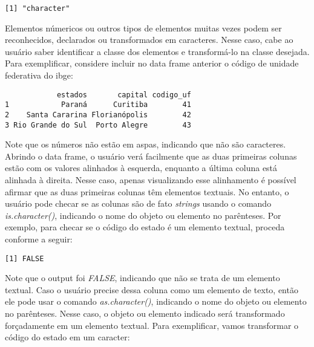\documentclass[
  letterpaper,
  DIV=11,
  numbers=noendperiod]{scrreprt}
\newenvironment{Shaded}{\begin{snugshade}}{\end{snugshade}}
\newcommand{\DecValTok}[1]{\textcolor[rgb]{0.68,0.00,0.00}{#1}}
\newcommand{\FunctionTok}[1]{\textcolor[rgb]{0.28,0.35,0.67}{#1}}
\newcommand{\NormalTok}[1]{\textcolor[rgb]{0.00,0.23,0.31}{#1}}
\newcommand{\OtherTok}[1]{\textcolor[rgb]{0.00,0.23,0.31}{#1}}
\newcommand{\SpecialCharTok}[1]{\textcolor[rgb]{0.37,0.37,0.37}{#1}}
\begin{document}
\begin{verbatim}
[1] "character"
\end{verbatim}

Elementos númericos ou outros tipos de elementos muitas vezes podem ser
reconhecidos, declarados ou transformados em caracteres. Nesse caso,
cabe ao usuário saber identificar a classe dos elementos e transformá-lo
na classe desejada. Para exemplificar, considere incluir no data frame
anterior o código de unidade federativa do ibge:

\begin{Shaded}
\end{Shaded}

\begin{verbatim}
            estados       capital codigo_uf
1            Paraná      Curitiba        41
2    Santa Cararina Florianópolis        42
3 Rio Grande do Sul  Porto Alegre        43
\end{verbatim}

Note que os números não estão em aspas, indicando que não são
caracteres. Abrindo o data frame, o usuário verá facilmente que as duas
primeiras colunas estão com os valores alinhados à esquerda, enquanto a
última coluna está alinhada à direita. Nesse caso, apenas visualizando
esse alinhamento é possível afirmar que as duas primeiras colunas têm
elementos textuais. No entanto, o usuário pode checar se as colunas são
de fato \emph{strings} usando o comando \emph{is.character()}, indicando
o nome do objeto ou elemento no parênteses. Por exemplo, para checar se
o código do estado é um elemento textual, proceda conforme a seguir:

\begin{Shaded}
\end{Shaded}

\begin{verbatim}
[1] FALSE
\end{verbatim}

Note que o output foi \emph{FALSE}, indicando que não se trata de um
elemento textual. Caso o usuário precise dessa coluna como um elemento
de texto, então ele pode usar o comando \emph{as.character()}, indicando
o nome do objeto ou elemento no parênteses. Nesse caso, o objeto ou
elemento indicado será transformado forçadamente em um elemento textual.
Para exemplificar, vamos transformar o código do estado em um caracter:
\end{document}
